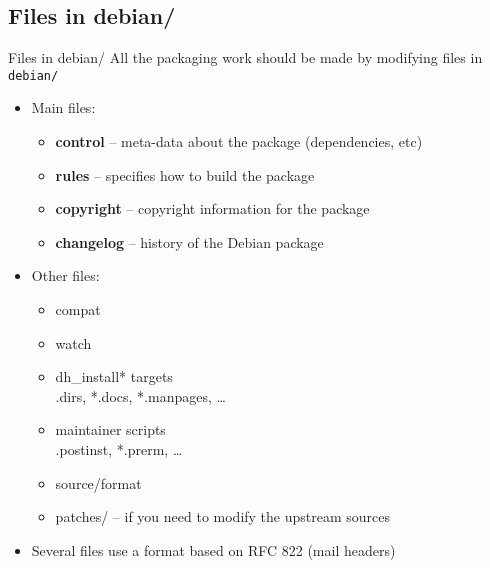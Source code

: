 \documentclass[red,10pt,a4paper]{beamer}
\begin{document}
\subsection{Files in debian/}
\begin{frame}{Files in debian/}
  All the packaging work should be made by modifying files in \texttt{debian/}
  \hbr
  \begin{itemize}
  \item Main files:
    \begin{itemize}
    \item \textbf{control} -- meta-data about the package (dependencies, etc)
    \item \textbf{rules} -- specifies how to build the package
    \item \textbf{copyright} -- copyright information for the package
    \item \textbf{changelog} -- history of the Debian package
    \end{itemize}
    \hbr
  \item Other files:
    \begin{itemize}
    \item compat
    \item watch
    \item dh\_install* targets\\
      {\small *.dirs, *.docs, *.manpages, \ldots}
    \item maintainer scripts\\
      {\small *.postinst, *.prerm, \ldots}
    \item source/format
    \item patches/ -- if you need to modify the upstream sources
    \end{itemize}
    \hbr
  \item Several files use a format based on RFC 822 (mail headers)
  \end{itemize}
\end{frame}
\end{document}
